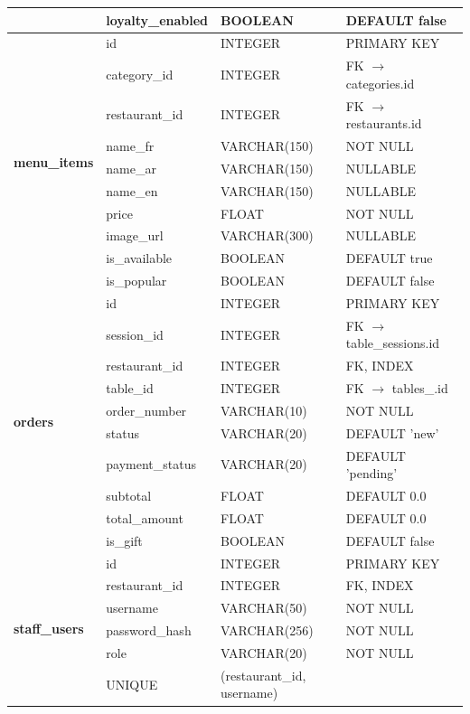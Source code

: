 \documentclass[12pt,a4paper]{report}
\begin{document}
\begin{table}[H]
\begin{tabularx}{\textwidth}{llXl}
        & loyalty\_enabled & BOOLEAN & DEFAULT false \\
        \midrule
        \multirow{10}{*}{\textbf{menu\_items}} & id & INTEGER & PRIMARY KEY \\
        & category\_id & INTEGER & FK $\rightarrow$ categories.id \\
        & restaurant\_id & INTEGER & FK $\rightarrow$ restaurants.id \\
        & name\_fr & VARCHAR(150) & NOT NULL \\
        & name\_ar & VARCHAR(150) & NULLABLE \\
        & name\_en & VARCHAR(150) & NULLABLE \\
        & price & FLOAT & NOT NULL \\
        & image\_url & VARCHAR(300) & NULLABLE \\
        & is\_available & BOOLEAN & DEFAULT true \\
        & is\_popular & BOOLEAN & DEFAULT false \\
        \midrule
        \multirow{10}{*}{\textbf{orders}} & id & INTEGER & PRIMARY KEY \\
        & session\_id & INTEGER & FK $\rightarrow$ table\_sessions.id \\
        & restaurant\_id & INTEGER & FK, INDEX \\
        & table\_id & INTEGER & FK $\rightarrow$ tables\_.id \\
        & order\_number & VARCHAR(10) & NOT NULL \\
        & status & VARCHAR(20) & DEFAULT 'new' \\
        & payment\_status & VARCHAR(20) & DEFAULT 'pending' \\
        & subtotal & FLOAT & DEFAULT 0.0 \\
        & total\_amount & FLOAT & DEFAULT 0.0 \\
        & is\_gift & BOOLEAN & DEFAULT false \\
        \midrule
        \multirow{6}{*}{\textbf{staff\_users}} & id & INTEGER & PRIMARY KEY \\
        & restaurant\_id & INTEGER & FK, INDEX \\
        & username & VARCHAR(50) & NOT NULL \\
        & password\_hash & VARCHAR(256) & NOT NULL \\
        & role & VARCHAR(20) & NOT NULL \\
        & UNIQUE & (restaurant\_id, username) & \\
        \bottomrule
    \end{tabularx}
\end{table}
\end{document}

